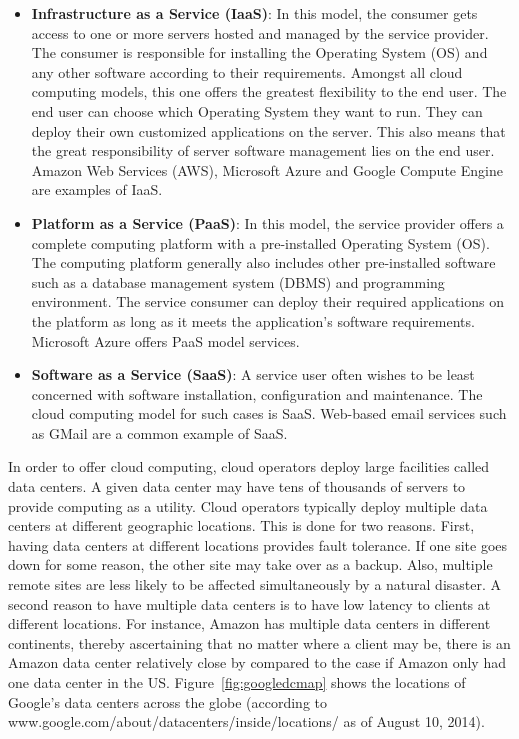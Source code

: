 \begin{itemize}
\item \textbf{Infrastructure as a Service (IaaS)}: In this model, the consumer gets access to one or more servers hosted and managed by the service provider. The consumer is responsible for installing the Operating System (OS) and any other software according to their requirements. Amongst all cloud computing models, this one offers the greatest flexibility to the end user. The end user can choose which Operating System they want to run. They can deploy their own customized applications on the server. This also means that the great responsibility of server software management lies on the end user. Amazon Web Services (AWS), Microsoft Azure and Google Compute Engine are examples of IaaS.
\item \textbf{Platform as a Service (PaaS)}: In this model, the service provider offers a complete computing platform with a pre-installed Operating System (OS). The computing platform generally also includes other pre-installed software such as a database management system (DBMS) and programming environment. The service consumer can deploy their required applications on the platform as long as it meets the application's software requirements. Microsoft Azure offers PaaS model services.
\item \textbf{Software as a Service (SaaS)}: A service user often wishes to be least concerned with software installation, configuration and maintenance. The cloud computing model for such cases is SaaS. Web-based email services such as GMail are a common example of SaaS.
\end{itemize}

In order to offer cloud computing, cloud operators deploy large facilities called data centers. A given data center may have tens of thousands of servers to provide computing as a utility. Cloud operators typically deploy multiple data centers at different geographic locations. This is done for two reasons. First, having data centers at different locations provides fault tolerance. If one site goes down for some reason, the other site may take over as a backup. Also, multiple remote sites are less likely to be affected simultaneously by a natural disaster. A second reason to have multiple data centers is to have low latency to clients at different locations. For instance, Amazon has multiple data centers in different continents, thereby ascertaining that no matter where a client may be, there is an Amazon data center relatively close by compared to the case if Amazon only had one data center in the US. Figure~\ref{fig:googledcmap} shows the locations of Google's data centers across the globe (according to www.google.com/about/datacenters/inside/locations/ as of August 10, 2014).

